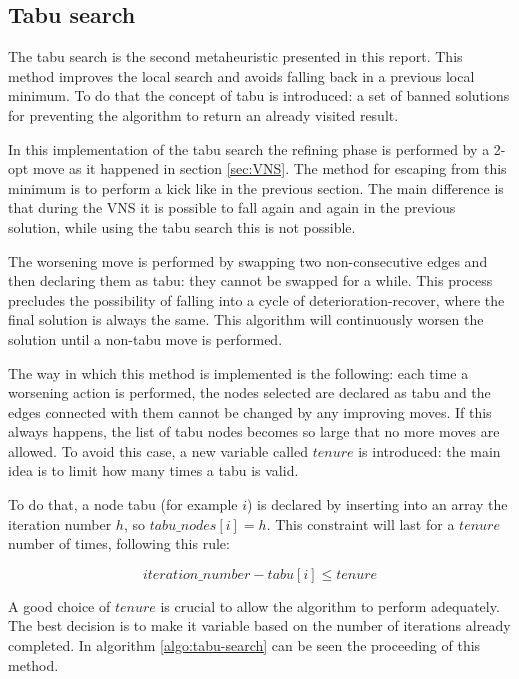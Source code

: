 \subsection{Tabu search}
\label{sec:tabu-search}
The tabu search is the second metaheuristic presented in this report. This method improves the local search and avoids falling back in a previous local minimum. To do that the concept of tabu is introduced: a set of banned solutions for preventing the algorithm to return an already visited result.

In this implementation of the tabu search the refining phase is performed by a 2-opt move as it happened in section \ref{sec:VNS}. The method for escaping from this minimum is to perform a kick like in the previous section. The main difference is that during the VNS it is possible to fall again and again in the previous solution, while using the tabu search this is not possible. 

The worsening move is performed by swapping two non-consecutive edges and then declaring them as tabu: they cannot be swapped for a while. This process precludes the possibility of falling into a cycle of deterioration-recover, where the final solution is always the same. This algorithm will continuously worsen the solution until a non-tabu move is performed.

The way in which this method is implemented is the following: each time a worsening action is performed, the nodes selected are declared as tabu and the edges connected with them cannot be changed by any improving moves. If this always happens, the list of tabu nodes becomes so large that no more moves are allowed. To avoid this case, a new variable called $tenure$ is introduced: the main idea is to limit how many times a tabu is valid.

To do that, a node tabu (for example $i$) is declared by inserting into an array the iteration number $h$, so $tabu\_nodes[i] = h$. This constraint will last for a $tenure$ number of times, following this rule:

\begin{equation}
	iteration\_number - tabu[i] \le tenure
\end{equation}

A good choice of $tenure$ is crucial to allow the algorithm to perform adequately. The best decision is to make it variable based on the number of iterations already completed. In algorithm \ref{algo:tabu-search} can be seen the proceeding of this method.

